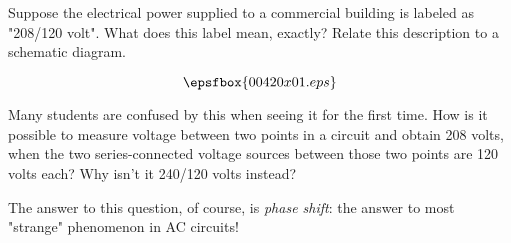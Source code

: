 

Suppose the electrical power supplied to a commercial building is labeled as "208/120 volt".  What does this label mean, exactly?  Relate this description to a schematic diagram.







$$\epsfbox{00420x01.eps}$$







Many students are confused by this when seeing it for the first time.  How is it possible to measure voltage between two points in a circuit and obtain 208 volts, when the two series-connected voltage sources between those two points are 120 volts each?  Why isn't it 240/120 volts instead?

The answer to this question, of course, is {\it phase shift}: the answer to most "strange" phenomenon in AC circuits!




